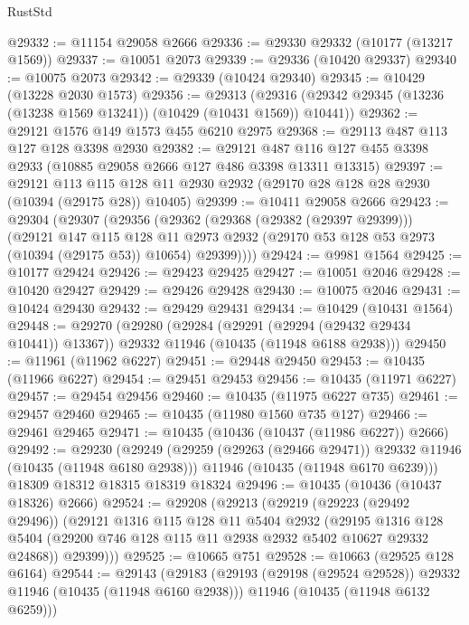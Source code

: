 \begin{lexlean}{RustStd}
\begin{coremodule}
@29332 := @11154 @29058 @2666
@29336 := @29330 @29332 (@10177 (@13217 @1569))
@29337 := @10051 @2073
@29339 := @29336 (@10420 @29337)
@29340 := @10075 @2073
@29342 := @29339 (@10424 @29340)
@29345 := @10429 (@13228 @2030 @1573)
@29356 := @29313
    (@29316 (@29342 @29345 (@13236 (@13238 @1569 @13241)) (@10429 (@10431 @1569)) @10441))
@29362 := @29121 @1576 @149 @1573 @455 @6210 @2975
@29368 := @29113 @487 @113 @127 @128 @3398 @2930
@29382 := @29121 @487 @116 @127 @455 @3398 @2933 (@10885 @29058 @2666 @127 @486 @3398 @13311 @13315)
@29397 := @29121
    @113
    @115
    @128
    @11
    @2930
    @2932
    (@29170 @28 @128 @28 @2930 (@10394 (@29175 @28)) @10405)
@29399 := @10411 @29058 @2666
@29423 := @29304
    (@29307
      (@29356
        (@29362
          (@29368 (@29382 (@29397 @29399)))
          (@29121
            @147
            @115
            @128
            @11
            @2973
            @2932
            (@29170 @53 @128 @53 @2973 (@10394 (@29175 @53)) @10654)
            @29399))))
@29424 := @9981 @1564
@29425 := @10177 @29424
@29426 := @29423 @29425
@29427 := @10051 @2046
@29428 := @10420 @29427
@29429 := @29426 @29428
@29430 := @10075 @2046
@29431 := @10424 @29430
@29432 := @29429 @29431
@29434 := @10429 (@10431 @1564)
@29448 := @29270
    (@29280
      (@29284 (@29291 (@29294 (@29432 @29434 @10441)) @13367))
      @29332
      @11946
      (@10435 (@11948 @6188 @2938)))
@29450 := @11961 (@11962 @6227)
@29451 := @29448 @29450
@29453 := @10435 (@11966 @6227)
@29454 := @29451 @29453
@29456 := @10435 (@11971 @6227)
@29457 := @29454 @29456
@29460 := @10435 (@11975 @6227 @735)
@29461 := @29457 @29460
@29465 := @10435 (@11980 @1560 @735 @127)
@29466 := @29461 @29465
@29471 := @10435 (@10436 (@10437 (@11986 @6227)) @2666)
@29492 := @29230
    (@29249
      (@29259 (@29263 (@29466 @29471)) @29332 @11946 (@10435 (@11948 @6180 @2938)))
      @11946
      (@10435 (@11948 @6170 @6239)))
    @18309
    @18312
    @18315
    @18319
    @18324
@29496 := @10435 (@10436 (@10437 @18326) @2666)
@29524 := @29208
    (@29213
      (@29219
        (@29223 (@29492 @29496))
        (@29121
          @1316
          @115
          @128
          @11
          @5404
          @2932
          (@29195
            @1316
            @128
            @5404
            (@29200 @746 @128 @115 @11 @2938 @2932 @5402 @10627 @29332 @24868))
          @29399)))
@29525 := @10665 @751
@29528 := @10663 (@29525 @128 @6164)
@29544 := @29143
    (@29183
      (@29193 (@29198 (@29524 @29528)) @29332 @11946 (@10435 (@11948 @6160 @2938)))
      @11946
      (@10435 (@11948 @6132 @6259)))

\end{coremodule}
\end{lexlean}
